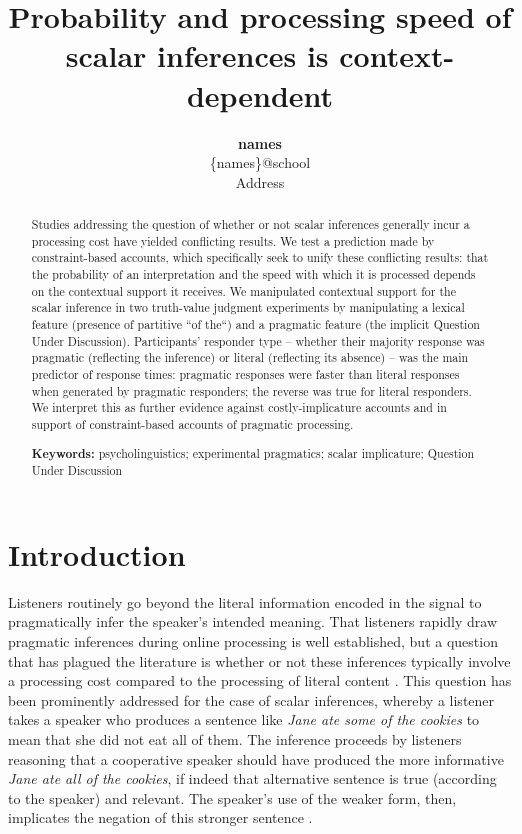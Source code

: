 \documentclass[10pt,letterpaper]{article}
\title{Probability and processing speed of scalar inferences is context-dependent}
\author{{\large \textbf{names}}  \\
 \{names\}@school\\
  Address}
\begin{document}
\maketitle


\begin{abstract}

Studies addressing the question of whether or not scalar inferences generally incur a processing cost  have yielded conflicting results. We test a prediction made by constraint-based accounts, which specifically seek to unify these conflicting results: that the probability of an interpretation and the speed with which it is processed depends on the contextual support it receives. We manipulated contextual support for the scalar inference in two truth-value judgment experiments  by manipulating a lexical feature (presence of partitive ``of the``) and a pragmatic feature (the implicit Question Under Discussion). Participants' responder type -- whether their majority response was pragmatic (reflecting the inference) or literal (reflecting its absence) -- was the main predictor of response times: pragmatic responses  were faster than literal responses when generated by pragmatic responders; the reverse was true for literal responders. We interpret this as further evidence against costly-implicature accounts and in support of constraint-based accounts of pragmatic processing.

\textbf{Keywords:} psycholinguistics; experimental pragmatics; scalar implicature; Question Under Discussion

\end{abstract}

\section{Introduction}

Listeners routinely go beyond the literal information encoded in the signal to pragmatically infer the speaker's intended meaning. That listeners rapidly draw pragmatic inferences during online processing is well established, but a question that has plagued the literature is whether or not these inferences typically involve a processing cost compared to the processing of literal content \cite{BottNoveck2004,BrehennyEtAl2006,HuangSnedeker2009,HuangSnedeker2011,Grodner2010,Breheny2013,DegenTanenhaus2016,Schaeken2007,TomlinsonEtAl2012}. This question has been prominently addressed for the case of scalar inferences, whereby a listener takes a speaker who produces a sentence like \textit{Jane ate some of the cookies} to mean that she did not eat all of them. The inference proceeds by listeners reasoning that a cooperative speaker should have produced the more informative \emph{Jane ate all of the cookies}, if indeed that alternative sentence is true (according to the speaker) and relevant. The speaker's use of the weaker form, then, implicates the negation of this stronger sentence \cite{Grice1975}.
\end{document}
